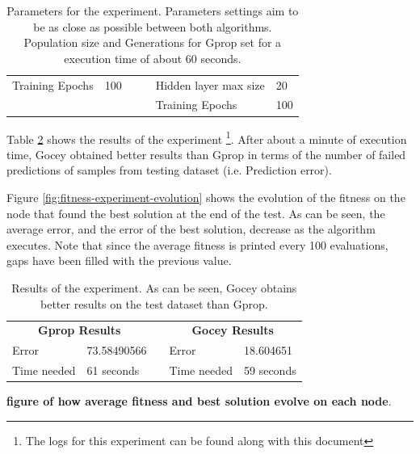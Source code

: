 \begin{table}[h!]
\begin{tabular}{llll|l|l|}
\multicolumn{1}{|l|}{Training Epochs}       & \multicolumn{1}{l|}{100}       &  &  & Hidden layer max size             & 20          \\ \cline{1-2} \cline{5-6} 
                                            &                                &  &  & Training Epochs                   & 100         \\ \cline{5-6} 
\end{tabular}
\caption{Parameters for the experiment. Parameters settings aim to be as close as possible between both algorithms. Population size and Generations for Gprop set for a execution time of about 60 seconds.}
\label{tab:fitness-experiment-parameters}
\end{table}

Table \ref{tab:fitness-experiment-results} shows the results of the experiment \footnote{The logs for this experiment can be found along with this document}. After about a minute of execution time, Gocey obtained better results than Gprop in terms of the number of failed predictions of samples from testing dataset (i.e. Prediction error).

Figure \ref{fig:fitness-experiment-evolution} shows the evolution of the fitness on the node that found the best solution at the end of the test. As can be seen, the average error, and the error of the best solution, decrease as the algorithm executes. Note that since the average fitness is printed every 100 evaluations, gaps have been filled with the previous value.

\begin{table}[h!]
\centering
\begin{tabular}{|l|l|l|l|l|}
\cline{1-2} \cline{4-5}
\multicolumn{2}{|c|}{\textbf{Gprop Results}} &           & \multicolumn{2}{c|}{\textbf{Gocey Results}} \\ \cline{1-2} \cline{4-5} 
Error                 & 73.58490566          &           & Error                 & 18.604651            \\ \cline{1-2} \cline{4-5} 
Time needed           & 61 seconds           & \textbf{} & Time needed           & 59 seconds           \\ \cline{1-2} \cline{4-5} 
\end{tabular}
\caption{Results of the experiment. As can be seen, Gocey obtains better results on the test dataset than Gprop.}
\label{tab:fitness-experiment-results}
\end{table}

\textbf{figure of how average fitness and best solution evolve on each node}.

